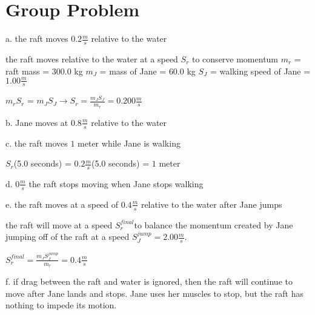 \chapter{Group Problem}
\label{Group Problem}
a. the raft moves $0.2 \frac{m}{s}$ relative to the water

the raft moves relative to the water at a speed $S_{r}$ to conserve momentum
$m_{r}$ = raft mass = $300.0$ kg
$m_{J}$ = mass of Jane = $60.0$ kg
$S_{J}$ = walking speed of Jane = $1.00 \frac{m}{s}$

$m_{r} S_{r}$ = $m_{J} S_{J} \rightarrow S_{r} = \frac{m_{J} S_{J}}{m_{r}} = 0.200 \frac{m}{s}$ 

b. Jane moves at $0.8 \frac{m}{s}$ relative to the water

c. the raft moves $1$ meter while Jane is walking

$S_{r}$(5.0 seconds) = $0.2 \frac{m}{s}$(5.0 seconds) = $1$ meter

d. $0 \frac{m}{s}$ the raft stops moving when Jane stops walking

e. the raft moves at a speed of $0.4 \frac{m}{s}$ relative to the water after Jane jumps

the raft will move at a speed $S_{r}^{final}$to balance the momentum created by Jane 
jumping off of the raft at a speed $S_{J}^{jump} = 2.00 \frac{m}{s}$.

$S_{r}^{final} = \frac{ m_{J} S_{J}^{jump}}{m_{r}} = 0.4 \frac{m}{s}$

f. if drag between the raft and water is ignored, then the raft will continue to move
after Jane lands and stops.  Jane uses her muscles to stop, but the raft has nothing
to impede its motion.

